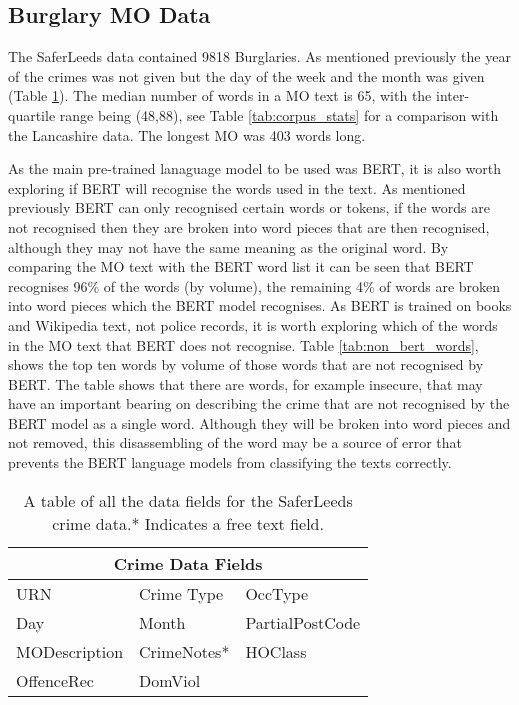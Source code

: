 \subsection{Burglary MO Data} The SaferLeeds data contained 9818 Burglaries. As mentioned previously the year of the crimes was not given but the day of the week and the month was given (Table \ref{tab:data_fields_saferleeds}). The median number of words in a MO text is 65, with the inter-quartile range being (48,88), see Table \ref{tab:corpus_stats} for a comparison with the Lancashire data. The longest MO was 403 words long.


As the main pre-trained lanaguage model to be used was BERT, it is also worth exploring if BERT will recognise the words used in the text. As mentioned previously BERT can only recognised certain words or tokens, if the words are not recognised then they are broken into word pieces that are then recognised, although they may not have the same meaning as the original word. By comparing the MO text with the BERT word list it can be seen that BERT recognises 96\% of the words  (by volume), the remaining 4\% of words are broken into word pieces which the BERT model recognises. As BERT is trained on books and Wikipedia text, not police records, it is worth exploring which of the words in the MO text that BERT does not recognise. Table \ref{tab:non_bert_words}, shows the top ten words by volume of those words that are not recognised by BERT. The table shows that there are words, for example insecure, that may have an important bearing on describing the crime that are not recognised by the BERT model as a single word. Although they will be broken into word pieces and not removed, this disassembling of the word  may be a source of error that prevents the BERT language models from classifying the texts correctly.

\begin{table}[]
\centering
\begin{tabular}{@{}lll@{}}
\toprule
\multicolumn{3}{c}{Crime Data Fields}                          \\ \midrule
URN & Crime Type       & OccType      \\
Day           & Month          & PartialPostCode                \\
MODescription & CrimeNotes*             & HOClass            \\
OffenceRec  &  DomViol          &           \\ \bottomrule
\end{tabular}
\caption{\label{tab:data_fields_saferleeds} A table of all the data fields for the SaferLeeds crime data.* Indicates a free text field.}
\end{table}


